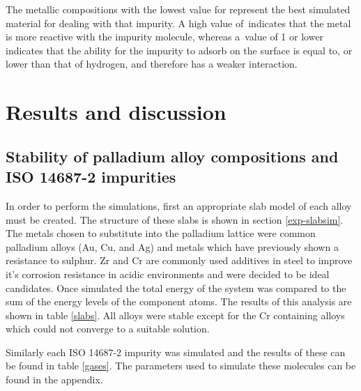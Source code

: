 The metallic compositions with the lowest value for \textsigma  represent the best simulated material for dealing with that impurity. A high value of \textsigma  \,indicates that the metal is more reactive with the impurity molecule, whereas a \textsigma \,value of 1 or lower indicates that the ability for the impurity to adsorb on the surface is equal to, or lower than that of hydrogen, and therefore has a weaker interaction. 

\section{Results and discussion}
\subsection{Stability of palladium alloy compositions and ISO 14687-2 impurities}
In order to perform the simulations, first an appropriate slab model of each alloy must be created. The structure of these slabs is shown in section \ref{exp-slabsim}. The metals chosen to substitute into the palladium lattice were common palladium alloys (Au, Cu, and Ag) and metals which have previously shown a resistance to sulphur. Zr\cite{SHIN2018102} and Cr\cite{MARCUS1990377} are commonly used additives in steel to improve it's corrosion resistance in acidic environments and were decided to be ideal candidates. Once simulated the total energy of the system was compared to the sum of the energy levels of the component atoms. The results of this analysis are shown in table \ref{slabs}. All alloys were stable except for the Cr containing alloys which could not converge to a suitable solution. 

Similarly each ISO 14687-2 impurity was simulated and the results of these can be found in table \ref{gases}. The parameters used to simulate these molecules can be found in the appendix.

